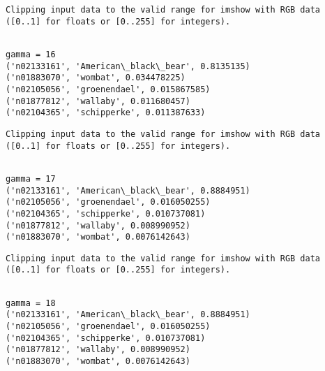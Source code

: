 \documentclass[11pt]{article}
\begin{document}
    \begin{Verbatim}[commandchars=\\\{\}]
Clipping input data to the valid range for imshow with RGB data ([0..1] for floats or [0..255] for integers).

    \end{Verbatim}

    \begin{Verbatim}[commandchars=\\\{\}]

gamma = 16
('n02133161', 'American\_black\_bear', 0.8135135)
('n01883070', 'wombat', 0.034478225)
('n02105056', 'groenendael', 0.015867585)
('n01877812', 'wallaby', 0.011680457)
('n02104365', 'schipperke', 0.011387633)

    \end{Verbatim}

    \begin{Verbatim}[commandchars=\\\{\}]
Clipping input data to the valid range for imshow with RGB data ([0..1] for floats or [0..255] for integers).

    \end{Verbatim}

    \begin{Verbatim}[commandchars=\\\{\}]

gamma = 17
('n02133161', 'American\_black\_bear', 0.8884951)
('n02105056', 'groenendael', 0.016050255)
('n02104365', 'schipperke', 0.010737081)
('n01877812', 'wallaby', 0.008990952)
('n01883070', 'wombat', 0.0076142643)

    \end{Verbatim}

    \begin{Verbatim}[commandchars=\\\{\}]
Clipping input data to the valid range for imshow with RGB data ([0..1] for floats or [0..255] for integers).

    \end{Verbatim}

    \begin{Verbatim}[commandchars=\\\{\}]

gamma = 18
('n02133161', 'American\_black\_bear', 0.8884951)
('n02105056', 'groenendael', 0.016050255)
('n02104365', 'schipperke', 0.010737081)
('n01877812', 'wallaby', 0.008990952)
('n01883070', 'wombat', 0.0076142643)

    \end{Verbatim}
\end{document}

